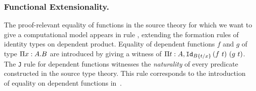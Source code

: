 \subsubsection{Functional Extensionality.} 
%
The proof-relevant equality of functions in the source theory for which we want to
give a computational model appears in rule ,
extending the formation rules of identity types on dependent product. 
%
Equality of dependent functions $f$ and $g$ of type $\Pi \vdecl{x}{A}\mdot B$ are
introduced by giving a witness of $\Pi t : A, \Id{B \{\subs x {t}\}}
{(f \ t)}{(g \ t)}$.
%
The \texttt{J} rule for dependent functions witnesses the
\emph{naturality} of every predicate constructed in the source type
theory.
%
This rule corresponds 
  to the introduction of equality on dependent functions in~\cite{DBLP:conf/popl/LicataH12}.

\def\hFin#1{\mathtt{\hat Fin}\ #1}
\def\Fin#1{\texttt{Fin}\ #1}
\def\fin#1#2{\underline{#1}_{#2}}




